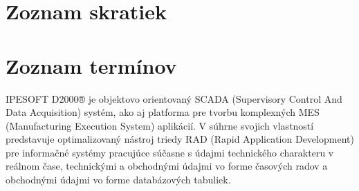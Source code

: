 \chapter*{Zoznam skratiek}
\begin{acronym}
\end{acronym}



\chapter*{Zoznam termínov}

IPESOFT D2000® je objektovo orientovaný SCADA (Supervisory Control And Data Acquisition) systém, ako aj platforma pre tvorbu komplexných MES (Manufacturing Execution System) aplikácií. V súhrne svojich vlastností predstavuje optimalizovaný nástroj triedy RAD (Rapid Application Development) pre informačné systémy pracujúce súčasne s údajmi technického charakteru v reálnom čase, technickými a obchodnými údajmi vo forme časových radov a obchodnými údajmi vo forme databázových tabuliek.




